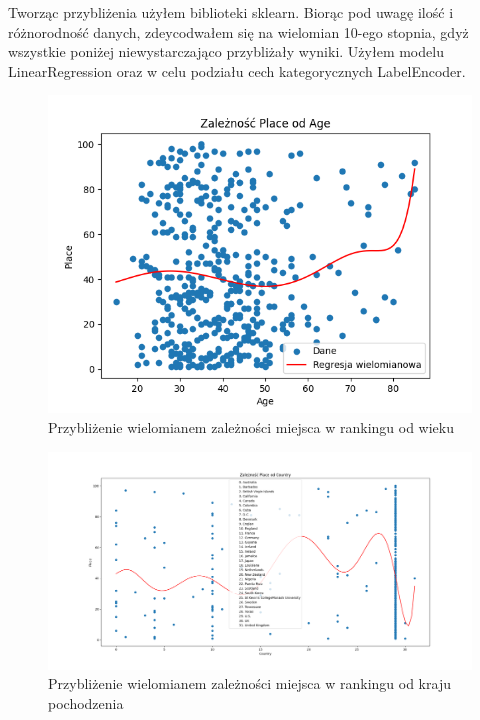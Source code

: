 \documentclass[12pt, letterpaper]{article}
\begin{document}
Tworząc przybliżenia użyłem biblioteki sklearn. Biorąc pod uwagę ilość i różnorodność danych, zdeycodwałem się na wielomian 10-ego stopnia, gdyż wszystkie poniżej niewystarczająco przybliżały wyniki. Użyłem modelu LinearRegression oraz w celu podziału cech kategorycznych LabelEncoder.
\begin{figure}[h]
    \centering
    \includegraphics[width=1\textwidth]{place_age_graph}  
    \caption{Przybliżenie wielomianem zależności miejsca w rankingu od wieku}
\end{figure}

\begin{figure}[h]
    \centering
    \includegraphics[width=1\textwidth]{place_country_graph}  
    \caption{Przybliżenie wielomianem zależności miejsca w rankingu od kraju pochodzenia}
\end{figure}
\end{document}
